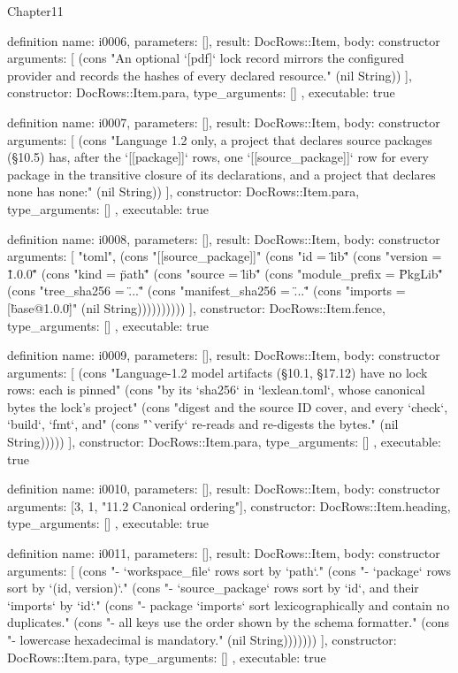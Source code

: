 \begin{lexlean}{Chapter11}
\begin{semanticmodule}
definition{
  name: i0006,
  parameters: [],
  result: DocRows::Item,
  body: constructor{
    arguments: [
      (cons "An optional `[pdf]` lock record mirrors the configured provider and records the hashes of every declared resource." (nil String))
    ],
    constructor: DocRows::Item.para,
    type_arguments: []
  },
  executable: true
}

definition{
  name: i0007,
  parameters: [],
  result: DocRows::Item,
  body: constructor{
    arguments: [
      (cons "Language 1.2 only, a project that declares source packages (§10.5) has, after the `[[package]]` rows, one `[[source_package]]` row for every package in the transitive closure of its declarations, and a project that declares none has none:" (nil String))
    ],
    constructor: DocRows::Item.para,
    type_arguments: []
  },
  executable: true
}

definition{
  name: i0008,
  parameters: [],
  result: DocRows::Item,
  body: constructor{
    arguments: [
      "toml",
      (cons "[[source_package]]" (cons "id = \"lib\"" (cons "version = \"1.0.0\"" (cons "kind = \"path\"" (cons "source = \"lib\"" (cons "module_prefix = \"PkgLib\"" (cons "tree_sha256 = \"...\"" (cons "manifest_sha256 = \"...\"" (cons "imports = [\"base@1.0.0\"]" (nil String))))))))))
    ],
    constructor: DocRows::Item.fence,
    type_arguments: []
  },
  executable: true
}

definition{
  name: i0009,
  parameters: [],
  result: DocRows::Item,
  body: constructor{
    arguments: [
      (cons "Language-1.2 model artifacts (§10.1, §17.12) have no lock rows: each is pinned" (cons "by its `sha256` in `lexlean.toml`, whose canonical bytes the lock's project" (cons "digest and the source ID cover, and every `check`, `build`, `fmt`, and" (cons "`verify` re-reads and re-digests the bytes." (nil String)))))
    ],
    constructor: DocRows::Item.para,
    type_arguments: []
  },
  executable: true
}

definition{
  name: i0010,
  parameters: [],
  result: DocRows::Item,
  body: constructor{
    arguments: [3, 1, "11.2 Canonical ordering"],
    constructor: DocRows::Item.heading,
    type_arguments: []
  },
  executable: true
}

definition{
  name: i0011,
  parameters: [],
  result: DocRows::Item,
  body: constructor{
    arguments: [
      (cons "- `workspace_file` rows sort by `path`." (cons "- `package` rows sort by `(id, version)`." (cons "- `source_package` rows sort by `id`, and their `imports` by `id`." (cons "- package `imports` sort lexicographically and contain no duplicates." (cons "- all keys use the order shown by the schema formatter." (cons "- lowercase hexadecimal is mandatory." (nil String)))))))
    ],
    constructor: DocRows::Item.para,
    type_arguments: []
  },
  executable: true
}


\end{semanticmodule}
\end{lexlean}
